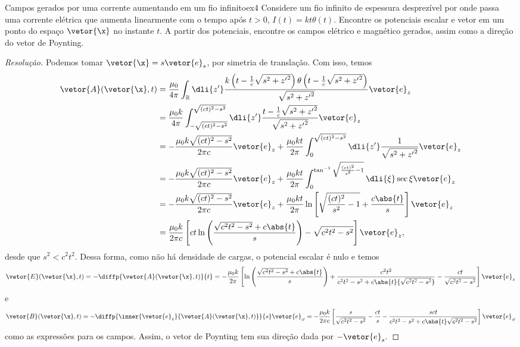 \begin{exercício}{Campos gerados por uma corrente aumentando em um fio infinito}{ex4}
   Considere um fio infinito de espessura desprezível por onde passa uma corrente elétrica que aumenta linearmente com o tempo após \(t > 0\), \(I(t) = kt\theta(t)\). Encontre os potenciais escalar e vetor em um ponto do espaço \(\vetor{\x}\) no instante \(t\). A partir dos potenciais, encontre os campos elétrico e magnético gerados, assim como a direção do vetor de Poynting.
\end{exercício}
\begin{proof}[Resolução]
   Podemos tomar \(\vetor{\x} = s \vetor{e}_s\), por simetria de translação. Com isso, temos
   \begin{align*}
      \vetor{A}(\vetor{\x}, t) &= \frac{\mu_0}{4\pi} \int_{\mathbb{R}} \dli{z'} \frac{k \left(t - \frac1c\sqrt{s^2 + {z'}^2}\right) \theta\left(t - \frac1c\sqrt{s^2 + {z'}^2}\right)}{\sqrt{s^2 + {z'}^2}}\vetor{e}_z\\
                               &= \frac{\mu_0 k}{4\pi} \int_{-\sqrt{(ct)^2 - s^2}}^{\sqrt{(ct)^2 - s^2}} \dli{z'} \frac{t - \frac1c \sqrt{s^2 + {z'}^2}}{\sqrt{s^2 + {z'}^2}}\vetor{e}_z\\
                               &= -\frac{\mu_0 k\sqrt{(ct)^2 - s^2}}{2\pi c}\vetor{e}_z + \frac{\mu_0 kt}{2\pi} \int_{0}^{\sqrt{(ct)^2 - s^2}} \dli{z'} \frac{1}{\sqrt{s^2 + {z'}^2}}\vetor{e}_z\\
                               &= -\frac{\mu_0 k\sqrt{(ct)^2 - s^2}}{2\pi c}\vetor{e}_z+ \frac{\mu_0 kt}{2\pi} \int_{0}^{\tan^{-1}\sqrt{\frac{(ct)^2}{s^2} - 1}} \dli{\xi} \sec\xi\vetor{e}_z\\
                               &= -\frac{\mu_0 k\sqrt{(ct)^2 - s^2}}{2\pi c}\vetor{e}_z + \frac{\mu_0 kt}{2\pi} \ln\left[\sqrt{\frac{(ct)^2}{s^2} - 1} + \frac{c\abs{t}}{s}\right] \vetor{e}_z\\
                               &= \frac{\mu_0 k}{2\pi c} \left[ct \ln\left(\frac{\sqrt{c^2 t^2 - s^2} + c \abs{t}}{s}\right) - \sqrt{c^2 t^2 - s^2}\right] \vetor{e}_z,
   \end{align*}
   desde que \(s^2 < c^2 t^2.\) Dessa forma, como não há densidade de cargas, o potencial escalar é nulo e temos
   \begin{equation*}
      \vetor{E}(\vetor{\x}, t) = -\diffp{\vetor{A}(\vetor{\x}, t)}{t} = -\frac{\mu_0 k}{2\pi} \left[\ln\left(\frac{\sqrt{c^2 t^2 - s^2} + c \abs{t}}{s}\right)  + \frac{c^2 t^2}{c^2 t^2 - s^2 + c \abs{t}{\sqrt{c^2 t^2 - s^2}}} - \frac{c t}{\sqrt{c^2 t^2 - s^2}}\right] \vetor{e}_z
   \end{equation*}
   e
   \begin{equation*}
      \vetor{B}(\vetor{\x}, t) = -\diffp{\inner{\vetor{e}_z}{\vetor{A}(\vetor{\x}, t)}}{s}\vetor{e}_\varphi =  
      -\frac{\mu_0 k}{2\pi c} \left[\frac{s}{\sqrt{c^2 t^2 - s^2}} - \frac{ct}{s} - \frac{s ct}{c^2 t^2  - s^2 + c \abs{t} \sqrt{c^2 t^2 - s^2}}\right] \vetor{e}_\varphi
   \end{equation*}
   como as expressões para os campos. Assim, o vetor de Poynting tem sua direção dada por \(- \vetor{e}_s.\)
\end{proof}

